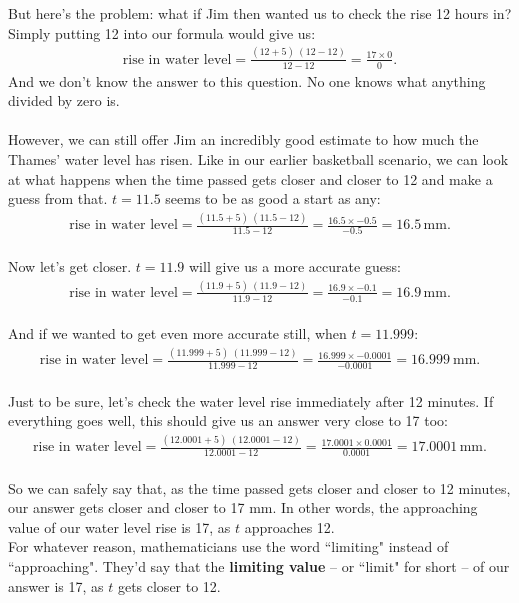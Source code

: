 \documentclass[11pt, leqno]{article}
\numberwithin{equation}{section}
\begin{document}
\\ \\ 
But here's the problem: what if Jim then wanted us to check the rise 12 hours in? Simply putting 12 into our formula would give us:
\begin{align*}
\text{rise in water level} = \frac{(12 + 5) \ (12 - 12)}{12 - 12} = \frac{17 \times 0}{0}.
\end{align*}
And we don't know the answer to this question. No one knows what anything divided by zero is. 
\\ \\
However, we can still offer Jim an incredibly good estimate to how much the Thames' water level has risen. Like in our earlier basketball scenario, we can look at what happens when the time passed gets closer and closer to 12 and make a guess from that. \(t = 11.5\) seems to be as good a start as any:
\begin{align*}
\text{rise in water level} = \frac{(11.5 + 5) \ (11.5 - 12)}{11.5 - 12} = \frac{16.5 \times -0.5}{-0.5} = 16.5 \, \text{mm.}
\end{align*}
\\ Now let's get closer. \(t = 11.9\) will give us a more accurate guess:
\begin{align*}
\text{rise in water level} = \frac{(11.9 + 5) \ (11.9 - 12)}{11.9 - 12} = \frac{16.9 \times -0.1}{-0.1} = 16.9 \, \text{mm.}
\end{align*}
\\ And if we wanted to get even more accurate still, when \(t = 11.999\):
\begin{align*}
\text{rise in water level} = \frac{(11.999 + 5) \ (11.999 - 12)}{11.999 - 12} = \frac{16.999 \times -0.0001}{-0.0001} = 16.999 \ \text{mm.}
\end{align*}
\\ Just to be sure, let's check the water level rise immediately after 12 minutes. If everything goes well, this should give us an answer very close to 17 too:
\begin{align*}
\text{rise in water level} = \frac{(12.0001 + 5) \ (12.0001 - 12)}{12.0001 - 12} = \frac{17.0001 \times 0.0001}{0.0001} = 17.0001 \, \text{mm.}
\end{align*}
\\ So we can safely say that, as the time passed gets closer and closer to 12 minutes, our answer gets closer and closer to 17 mm. In other words, the approaching value of our water level rise is 17, as \(t\) approaches 12.
\\ For whatever reason, mathematicians use the word ``limiting" instead of ``approaching". They'd say that the \textbf{limiting value} -- or ``limit" for short -- of our answer is 17, as \(t\) gets closer to 12.
\end{document}
